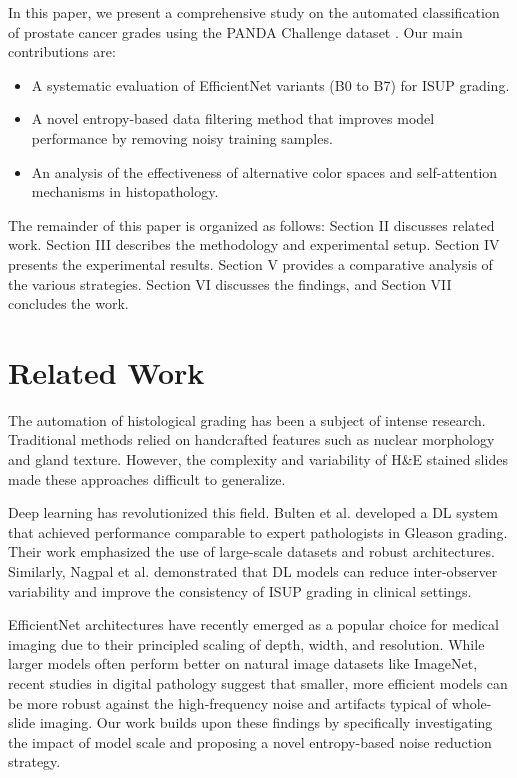 \documentclass[10pt,conference]{IEEEtran}
\begin{document}
In this paper, we present a comprehensive study on the automated classification of prostate cancer grades using the PANDA Challenge dataset \cite{panda2020}. Our main contributions are:
\begin{itemize}
    \item A systematic evaluation of EfficientNet variants (B0 to B7) for ISUP grading.
    \item A novel entropy-based data filtering method that improves model performance by removing noisy training samples.
    \item An analysis of the effectiveness of alternative color spaces and self-attention mechanisms in histopathology.
\end{itemize}

The remainder of this paper is organized as follows: Section II discusses related work. Section III describes the methodology and experimental setup. Section IV presents the experimental results. Section V provides a comparative analysis of the various strategies. Section VI discusses the findings, and Section VII concludes the work.

\section{Related Work}
The automation of histological grading has been a subject of intense research. Traditional methods relied on handcrafted features such as nuclear morphology and gland texture. However, the complexity and variability of H\&E stained slides made these approaches difficult to generalize.

Deep learning has revolutionized this field. Bulten et al. \cite{bulten2020automated} developed a DL system that achieved performance comparable to expert pathologists in Gleason grading. Their work emphasized the use of large-scale datasets and robust architectures. Similarly, Nagpal et al. demonstrated that DL models can reduce inter-observer variability and improve the consistency of ISUP grading in clinical settings.

EfficientNet architectures \cite{tan2019efficientnet} have recently emerged as a popular choice for medical imaging due to their principled scaling of depth, width, and resolution. While larger models often perform better on natural image datasets like ImageNet, recent studies in digital pathology suggest that smaller, more efficient models can be more robust against the high-frequency noise and artifacts typical of whole-slide imaging. Our work builds upon these findings by specifically investigating the impact of model scale and proposing a novel entropy-based noise reduction strategy.
\end{document}

